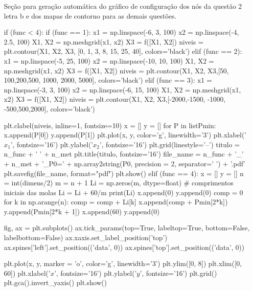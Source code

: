 \documentclass[10pt, a4paper]{article}
\begin{document}
Seção para geração automática do gráfico de configuração dos nós da questão 2 letra b e dos mapas de contorno para as demais questões.

\begin{python}
  if (func < 4):
    if (func == 1):
        x1 = np.linspace(-6, 3, 100)
        x2 = np.linspace(-4, 2.5, 100)
        X1, X2 = np.meshgrid(x1, x2)
        X3 = f([X1, X2])
        niveis = plt.contour(X1, X2, X3, [0, 1, 3, 8, 15, 25, 40], colors='black')
    elif (func == 2):
        x1 = np.linspace(-5, 25, 100)
        x2 = np.linspace(-10, 10, 100)
        X1, X2 = np.meshgrid(x1, x2)
        X3 = f([X1, X2])
        niveis = plt.contour(X1, X2, X3,[50, 100,200,500, 1000, 2000, 5000], colors='black')
    elif (func == 3):
        x1 = np.linspace(-3, 3, 100)
        x2 = np.linspace(-6, 15, 100)
        X1, X2 = np.meshgrid(x1, x2)
        X3 = f([X1, X2])
        niveis = plt.contour(X1, X2, X3,[-2000,-1500, -1000, -500,500,2000], colors='black')
        
    plt.clabel(niveis, inline=1, fontsize=10)
    x = []
    y = []
    for P in listPmin:
        x.append(P[0])
        y.append(P[1])
    plt.plot(x, y, color='g', linewidth='3')
    plt.xlabel('$x_1$', fontsize='16')
    plt.ylabel('$x_2$', fontsize='16')
    plt.grid(linestyle='--')
    titulo = n_func + ' ' + n_met
    plt.title(titulo, fontsize='16')
    file_name = n_func + '_' + n_met + '_P0=' + np.array2string(P0, precision = 2, separator=' ') + '.pdf'
    plt.savefig(file_name, format="pdf")
    plt.show()
  elif (func == 4):
      x = []
      y = []
      n = int(dimens/2)
      m = n + 1
      Li = np.zeros(m, dtype=float) # comprimentos iniciais das molas
      Li = Li + 60/m
      print(Li)
      x.append(0)
      y.append(0)
      comp = 0
      for k in np.arange(n):
          comp = comp + Li[k]
          x.append(comp + Pmin[2*k])
          y.append(Pmin[2*k + 1])
      x.append(60)
      y.append(0)
      
      fig, ax = plt.subplots()
      ax.tick_params(top=True, labeltop=True, bottom=False, labelbottom=False)
      ax.xaxis.set_label_position('top')
      ax.spines['left'].set_position(('data', 0))
      ax.spines['top'].set_position(('data', 0))

          
      plt.plot(x, y, marker = 'o', color='g', linewidth='3')
      plt.ylim([0, 8])
      plt.xlim([0, 60])
      plt.xlabel('$x$', fontsize='16')
      plt.ylabel('$y$', fontsize='16')
      plt.grid()
      plt.gca().invert_yaxis()
      plt.show()
\end{python}
\end{document}
